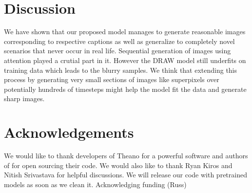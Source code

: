 \documentclass{article} %
\begin{document}

\section{Discussion}

We have shown that our proposed model manages to generate reasonable images corresponding to respective captions as well as generalize to completely novel scenarios that never occur in real life. Sequential generation of images using attention played a crutial part in it. However the DRAW model still underfits on training data which leads to the blurry samples. We think that extending this process by generating very small sections of images like superpixels over potentially hundreds of timesteps might help the model fit the data and generate sharp images.

\section{Acknowledgements}
We would like to thank developers of Theano for a powerful software and authors of \cite{denton_lapgan} for open sourcing their code. We would also like to thank Ryan Kiros and Nitish Srivastava for helpful discussions. We will release our code with pretrained models as soon as we clean it. Acknowledging funding (Russ)




\newpage
\appendix

\end{document}
